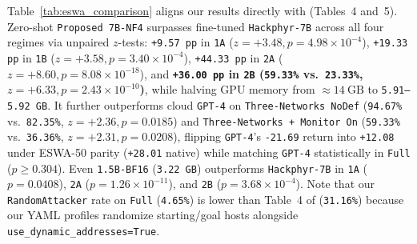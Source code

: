 \documentclass[a4paper,fleqn]{cas-dc}
\begin{document}
Table~\ref{tab:eswa_comparison} aligns our results directly with \citet{rigaki2026building} (Tables~4 and~5). Zero-shot \texttt{Proposed 7B-NF4} surpasses fine-tuned \texttt{Hackphyr-7B} across all four regimes via unpaired $z$-tests: \texttt{+9.57 pp} in \texttt{1A} ($z=+3.48, p=4.98 \times 10^{-4}$), \texttt{+19.33 pp} in \texttt{1B} ($z=+3.58, p=3.40 \times 10^{-4}$), \texttt{+44.33 pp} in \texttt{2A} ($z=+8.60, p=8.08 \times 10^{-18}$), and \textbf{\texttt{+36.00 pp} in \texttt{2B} (\texttt{59.33\%} vs.\ \texttt{23.33\%}, $z=+6.33, p=2.43 \times 10^{-10}$)}, while halving GPU memory from $\approx 14~\text{GB}$ to \texttt{5.91--5.92 GB}. It further outperforms cloud \texttt{GPT-4} on \texttt{Three-Networks NoDef} (\texttt{94.67\%} vs.\ \texttt{82.35\%}, $z=+2.36, p=0.0185$) and \texttt{Three-Networks + Monitor On} (\texttt{59.33\%} vs.\ \texttt{36.36\%}, $z=+2.31, p=0.0208$), flipping \texttt{GPT-4}'s \texttt{-21.69} return into \texttt{+12.08} under ESWA-50 parity (\texttt{+28.01} native) while matching \texttt{GPT-4} statistically in \texttt{Full} ($p \ge 0.304$). Even \texttt{1.5B-BF16} (\texttt{3.22 GB}) outperforms \texttt{Hackphyr-7B} in \texttt{1A} ($p=0.0408$), \texttt{2A} ($p=1.26 \times 10^{-11}$), and \texttt{2B} ($p=3.68 \times 10^{-4}$). Note that our \texttt{RandomAttacker} rate on \texttt{Full} (\texttt{4.65\%}) is lower than Table~4 of \citet{rigaki2026building} (\texttt{31.16\%}) because our YAML profiles randomize starting/goal hosts alongside \texttt{use\_dynamic\_addresses=True}.
\end{document}
